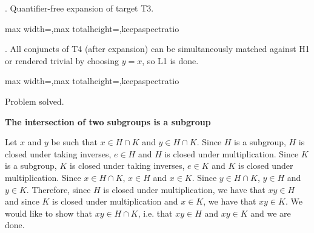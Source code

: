 \documentclass[a4paper,twoside,12pt]{article}
\makeatletter
\DeclareRobustCommand{\_}{%
  \leavevmode\vbox{%
    \hrule\@width.4em
          \@height-.16ex
          \@depth\dimexpr.16ex+.28pt\relax}}
\newcommand\Tstrut{\rule{0pt}{2.4ex}}
\newcommand\Bstrut{\rule[-1.1ex]{0pt}{0pt}}
\newenvironment{fit}{\begin{adjustbox}{max width=\textwidth,max totalheight=\textheight,keepaspectratio}}{\end{adjustbox}}
\makeatother
\begin{document}
\begin{steps}
. Quantifier-free expansion of target T3.\nopagebreak[4] 
\nopagebreak[4] 
\smallskip\nopagebreak[4] 

\begin{fit}%
\end{fit}
\smallskip

. All conjuncts of T4 (after expansion) can be simultaneously matched against H1 or rendered trivial by choosing $y = x$, so L1 is done.\nopagebreak[4] 
\nopagebreak[4] 
\smallskip\nopagebreak[4] 

\begin{fit}%
\end{fit}

Problem solved.
\cleardoublepage

\end{steps}
{\begin{center} \large \textbf{The intersection of two subgroups is a subgroup}\end{center}}\nopagebreak[4]

\begin{center}
\begin{minipage}{120mm}
Let $x$ and $y$ be such that $x\in H\cap K$ and $y\in H\cap K$. Since $H$ is a subgroup, $H$ is closed under taking inverses, $e\in H$ and $H$ is closed under multiplication. Since $K$ is a subgroup, $K$ is closed under taking inverses, $e\in K$ and $K$ is closed under multiplication. Since $x\in H\cap K$, $x\in H$ and $x\in K$. Since $y\in H\cap K$, $y\in H$ and $y\in K$. Therefore, since $H$ is closed under multiplication, we have that $xy\in H$ and since $K$ is closed under multiplication and $x\in K$, we have that $xy\in K$. We would like to show that $xy\in H\cap K$, i.e. that $xy\in H$ and $xy\in K$ and we are done.
\end{minipage}
\end{center}
\end{document}
